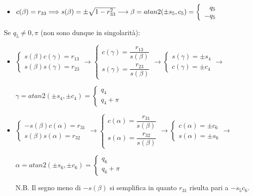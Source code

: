 \documentclass[a4paper,12pt]{article}
\begin{document}
\begin{itemize}
\item  $c(\beta) = r_{33} \Longrightarrow s(\beta) = \pm \sqrt{1-r_{33}^2}
		\hfill \longrightarrow \hfill
		\beta = atan2 (\pm s_5, c_5) = \left \{ \begin{array}{rl}
		q_5\\
		-q_5
		\end{array}
		\right.$
\end{itemize}
Se $q_5 \neq 0,\pi$ (non sono dunque in singolarità):
\begin{itemize}	

\item $\left \{ \begin{array}{rl}
		s(\beta)c(\gamma)=r_{13} \\
		s(\beta)s(\gamma)=r_{23}
		\end{array}
		\right. %
		\longrightarrow
		\left \{ \begin{array}{rl}
		c(\gamma)=\dfrac{r_{13}}{s(\beta)} \\
		s(\gamma)=\dfrac{r_{23}}{s(\beta)}
		\end{array}
		\right.
		\longrightarrow
		\left \{ \begin{array}{rl}
		s(\gamma)=\pm s_4\\
		c(\gamma)=\pm c_4
		\end{array}
		\right.
		\longrightarrow $
				
		$\gamma = atan2 (\pm s_4,\pm c_4) =
		\left \{ \begin{array}{rl}
		q_4\\
		q_4+\pi
		\end{array}
		\right.$
		
		
\item $\left \{ \begin{array}{rl}
		-s(\beta)c(\alpha)=r_{31} \\
		s(\beta)s(\alpha)=r_{32}
		\end{array}
		\right. %
		\longrightarrow
		\left \{ \begin{array}{rl}
		c(\alpha)=\dfrac{r_{31}}{s(\beta)} \\
		s(\alpha)=\dfrac{r_{32}}{s(\beta)}
		\end{array}
		\right.
		\longrightarrow
		\left \{ \begin{array}{rl}
		c(\alpha)=\pm c_6\\
		s(\alpha)=\pm s_6
		\end{array}
		\right.
		\longrightarrow $
				
		$\alpha = atan2 (\pm s_6,\pm c_6) =
		\left \{ \begin{array}{rl}
		q_6\\
		q_6+\pi
		\end{array}
		\right.$

N.B. Il segno meno di $-s(\beta)$ si semplifica in quanto ${ r_{31}}$ risulta pari a ${-s_5 c_6}$.
\end{itemize}
\newpage
\end{document}
